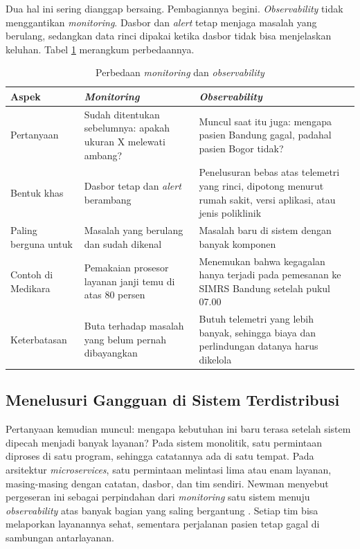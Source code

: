 Dua hal ini sering dianggap bersaing. Pembagiannya begini. \textit{Observability} tidak
menggantikan \textit{monitoring}. Dasbor dan \textit{alert} tetap menjaga masalah yang berulang,
sedangkan data rinci dipakai ketika dasbor tidak bisa menjelaskan keluhan. Tabel
\ref{tab:ch11-monitoring-observability} merangkum perbedaannya.

\begin{table}[!htb]
  \centering
  \caption{Perbedaan \textit{monitoring} dan \textit{observability}}
  \label{tab:ch11-monitoring-observability}
  \footnotesize
  \begin{tabularx}{\textwidth}{>{\raggedright\arraybackslash}p{2.3cm} >{\raggedright\arraybackslash}X >{\raggedright\arraybackslash}X}
    \hline
    \textbf{Aspek} & \textbf{\textit{Monitoring}} & \textbf{\textit{Observability}} \\ \hline
    Pertanyaan & Sudah ditentukan sebelumnya: apakah ukuran X melewati ambang? & Muncul saat
      itu juga: mengapa pasien Bandung gagal, padahal pasien Bogor tidak? \\ \hline
    Bentuk khas & Dasbor tetap dan \textit{alert} berambang & Penelusuran bebas atas telemetri
      yang rinci, dipotong menurut rumah sakit, versi aplikasi, atau jenis poliklinik \\ \hline
    Paling berguna untuk & Masalah yang berulang dan sudah dikenal & Masalah baru di sistem
      dengan banyak komponen \\ \hline
    Contoh di Medikara & Pemakaian prosesor layanan janji temu di atas 80 persen & Menemukan
      bahwa kegagalan hanya terjadi pada pemesanan ke SIMRS Bandung setelah pukul 07.00 \\ \hline
    Keterbatasan & Buta terhadap masalah yang belum pernah dibayangkan & Butuh telemetri yang
      lebih banyak, sehingga biaya dan perlindungan datanya harus dikelola \\ \hline
  \end{tabularx}
\end{table}

\subsection{Menelusuri Gangguan di Sistem Terdistribusi}

Pertanyaan kemudian muncul: mengapa kebutuhan ini baru terasa setelah sistem dipecah menjadi
banyak layanan? Pada sistem monolitik, satu permintaan diproses di satu program, sehingga
catatannya ada di satu tempat. Pada arsitektur \textit{microservices}, satu permintaan melintasi
lima atau enam layanan, masing-masing dengan catatan, dasbor, dan tim sendiri. Newman menyebut
pergeseran ini sebagai perpindahan dari \textit{monitoring} satu sistem menuju
\textit{observability} atas banyak bagian yang saling bergantung \cite{newman2021}. Setiap tim bisa
melaporkan layanannya sehat, sementara perjalanan pasien tetap gagal di sambungan antarlayanan.

